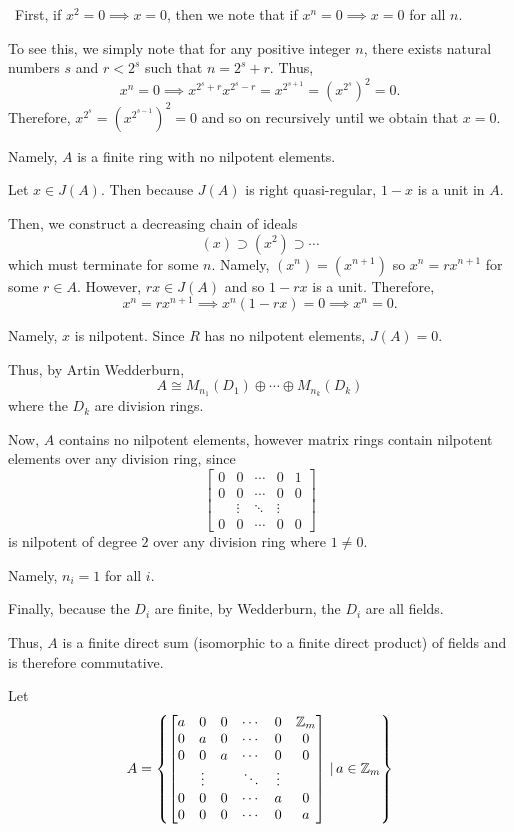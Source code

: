 \documentclass[12pt]{Qual}
\begin{document}
\begin{solution}$\,$
First, if $x^2=0\implies x=0$, then we note that if $x^n=0\implies x=0$ for all $n.$

To see this, we simply note that for any positive integer $n$, there exists natural numbers $s$ and $r<2^s$ such that $n=2^s+r$. Thus, $$x^n=0\implies x^{2^s+r}x^{2^s-r}=x^{2^{s+1}}=(x^{2^s})^2=0.$$ Therefore, $x^{2^s}=(x^{2^{s-1}})^2=0$ and so on recursively until we obtain that $x=0.$

Namely, $A$ is a finite ring with no nilpotent elements.

Let $x\in J(A)$. Then because $J(A)$ is right quasi-regular, $1-x$ is a unit in $A$.

Then, we construct a decreasing chain of ideals $$(x)\supset (x^2)\supset\cdots$$ which must terminate for some $n$. Namely, $(x^n)=(x^{n+1})$ so $x^n=rx^{n+1}$ for some $r\in A$. However, $rx\in J(A)$ and so $1-rx$ is a unit. Therefore, $$x^n=rx^{n+1}\implies x^n(1-rx)=0\implies x^n=0.$$

Namely, $x$ is nilpotent. Since $R$ has no nilpotent elements, $J(A)=0.$

Thus, by Artin Wedderburn, $$A\cong M_{n_1}(D_1)\oplus\cdots\oplus M_{n_k}(D_k)$$ where the $D_k$ are division rings.

Now, $A$ contains no nilpotent elements, however matrix rings contain nilpotent elements over any division ring, since $$\begin{bmatrix}
0 & 0 &\cdots & 0 & 1\\
0 & 0 &\cdots & 0 & 0\\
& \vdots &\ddots & \vdots &\\
0 & 0 &\cdots & 0 & 0
\end{bmatrix}$$ is nilpotent of degree $2$ over any division ring where $1\not=0$.

Namely, $n_i=1$ for all $i$.

Finally, because the $D_i$ are finite, by Wedderburn, the $D_i$ are all fields.

Thus, $A$ is a finite direct sum (isomorphic to a finite direct product) of fields and is therefore commutative.

Let $$A=\left\{\begin{bmatrix}
a & 0 & 0 & \cdots & 0 & \mathbb{Z}_m \\
0 & a  & 0 &\cdots & 0 & 0\\
0 & 0 & a  &\cdots & 0 & 0\\
& \vdots & &\ddots & \vdots & \\
0 & 0 & 0 & \cdots & a  & 0\\
0 & 0 & 0 &\cdots & 0 & a
\end{bmatrix}\,\Huge|\,a\in \mathbb{Z}_m \right\}$$


\end{solution}
\end{document}
